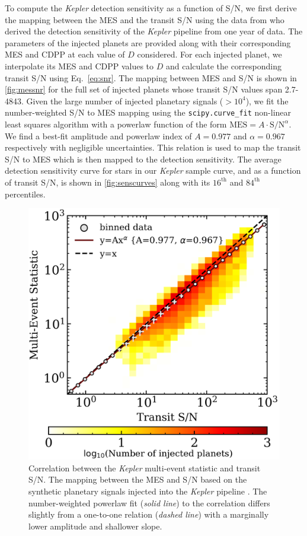 \documentclass[twocolumn]{emulateapj}
\newcommand{\kepler}[1]{\emph{Kepler}#1}
\begin{document}
To compute the \kepler{} detection sensitivity as a function of S/N, we first
derive the mapping between the MES and the transit S/N using the data from \cite{christiansen15} who
derived the detection sensitivity of the \kepler{} pipeline from one year of data. 
The parameters of the injected planets are provided along with their corresponding MES and CDPP at each value of
$D$ considered. For each injected planet, we interpolate its MES and CDPP values to $D$ and calculate
the corresponding transit S/N using Eq.~\ref{eq:snr}. The mapping between MES and S/N is shown in \autoref{fig:messnr}
for the full set of injected planets whose transit S/N values span 2.7-4843. Given the large number of injected planetary
signals ($>10^4$), we fit the number-weighted S/N to MES mapping using the \texttt{scipy.curve\_fit} non-linear least
squares algorithm with a powerlaw function of the form $\text{MES} = A\cdot \text{S/N}^{\alpha}$. We find a best-fit
amplitude and powerlaw index of $A=0.977$ and $\alpha=0.967$ respectively with negligible uncertainties.
This relation is used to map the transit S/N to MES
which is then mapped to the detection sensitivity. The average detection sensitivity curve for stars in our
\kepler{} sample curve, and as a function of transit S/N, is shown in \autoref{fig:senscurves}
along with its $16^{\text{th}}$ and $84^{\text{th}}$ percentiles.


\begin{figure}
  \centering
  \includegraphics[width=0.98\hsize]{figures/MES_SNR.png}
  \caption{Correlation between the \kepler{} multi-event statistic and transit S/N. The mapping between the MES and
    S/N based on the synthetic planetary signals injected into the \kepler{} pipeline \citep{christiansen15}.
    The number-weighted powerlaw fit (\emph{solid line}) to the correlation differs slightly from a one-to-one relation
    (\emph{dashed line}) with a marginally lower amplitude and shallower slope.}  
  \label{fig:messnr}
\end{figure}
\end{document}
